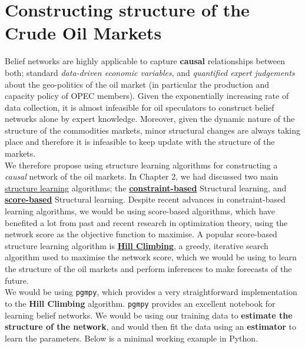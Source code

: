 \section{Constructing structure of the Crude Oil Markets}

Belief networks are highly applicable to capture \textbf{causal} relationships between both; standard \textit{data-driven economic variables}, and \textit{quantified expert judgements} about the geo-politics of the oil market (in particular the production and capacity policy of OPEC members). Given the exponentially increasing rate of data collection, it is almost infeasible for oil speculators to construct belief networks alone by expert knowledge. Moreover, given the dynamic nature of the structure of the commodities markets, minor structural changes are always taking place and therefore it is infeasible to keep update with the structure of the markets. \\

We therefore propose using structure learning algorithms for constructing a \textit{causal} network of the oil markets. In Chapter 2, we had discussed two main \hyperref[structure]{structure learning} algorithms; the \hyperref[constraint]{\textbf{constraint-based}} Structural learning, and  \hyperref[scorebased]{\textbf{score-based}} Structural learning. Despite recent advances in constraint-based learning algorithms\cite{pellet2008using}, we would be using score-based algorithms, which have benefited a lot from past and recent research in optimization theory, using the network score as the objective function to maximise\cite{scutari2014bayesian}. A popular score-based structure learning algorithm is \hyperref[scorebased]{\textbf{Hill Climbing}}, a greedy, iterative search algorithm used to maximise the network score, which we would be using to learn the structure of the oil markets and perform inferences to make forecasts of the future. \\

We would be using \texttt{pgmpy}, which provides a very straightforward implementation to the \textbf{Hill Climbing} algorithm. \texttt{pgmpy} provides an excellent notebook \cite{pgmpynotebook} for learning belief networks. We would be using our training data to \textbf{estimate the structure of the network}, and would then fit the data using an \textbf{estimator} to learn the parameters. Below is a minimal working example in Python.

